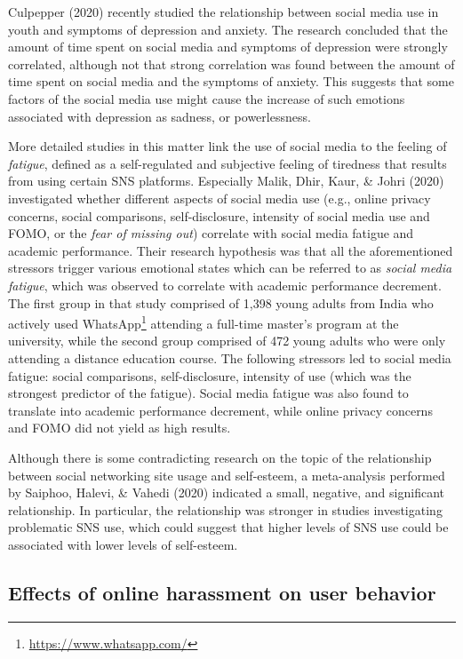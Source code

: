 \documentclass[10pt,dvipsnames]{scrartcl}
\begin{document}
Culpepper (2020) recently studied the relationship between social media
use in youth and symptoms of depression and anxiety. The research
concluded that the amount of time spent on social media and symptoms of
depression were strongly correlated, although not that strong
correlation was found between the amount of time spent on social media
and the symptoms of anxiety. This suggests that some factors of the
social media use might cause the increase of such emotions associated
with depression as sadness, or powerlessness.

More detailed studies in this matter link the use of social media to the
feeling of \textit{fatigue}, defined as a self-regulated and subjective
feeling of tiredness that results from using certain SNS platforms.
Especially Malik, Dhir, Kaur, \& Johri (2020) investigated whether
different aspects of social media use (e.g., online privacy concerns,
social comparisons, self-disclosure, intensity of social media use and
FOMO, or the \textit{fear of missing out}) correlate with social media
fatigue and academic performance. Their research hypothesis was that all
the aforementioned stressors trigger various emotional states which can
be referred to as \textit{social media fatigue}, which was observed to
correlate with academic performance decrement. The first group in that
study comprised of 1,398 young adults from India who actively used
WhatsApp\footnote{\url{https://www.whatsapp.com/}} attending a full-time
master's program at the university, while the second group comprised of
472 young adults who were only attending a distance education course.
The following stressors led to social media fatigue: social comparisons,
self-disclosure, intensity of use (which was the strongest predictor of
the fatigue). Social media fatigue was also found to translate into
academic performance decrement, while online privacy concerns and FOMO
did not yield as high results.

Although there is some contradicting research on the topic of the
relationship between social networking site usage and self-esteem, a
meta-analysis performed by Saiphoo, Halevi, \& Vahedi (2020) indicated a
small, negative, and significant relationship. In particular, the
relationship was stronger in studies investigating problematic SNS use,
which could suggest that higher levels of SNS use could be associated
with lower levels of self-esteem.

\subsection{Effects of online harassment on user behavior}
\end{document}
